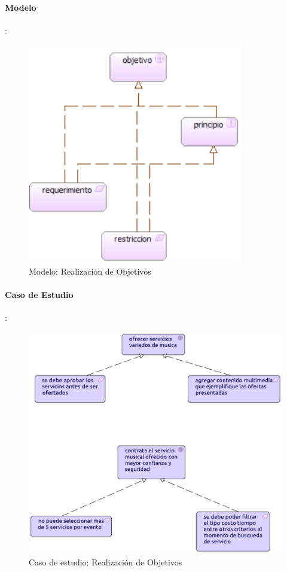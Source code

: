 \paragraph{Modelo}:
\begin{figure}[h!]
	\centering
	\includegraphics[width=0.6\linewidth]{Desarrollo/ArquitecturaEmpresarial/Motivacion/imgs/realizacionObjMetamodelo.PNG}
	\caption{Modelo: Realización de Objetivos}
\end{figure}

\newpage

\paragraph{Caso de Estudio}:

\begin{figure}[h!]
	\centering
	\includegraphics[width=\linewidth]{Desarrollo/ArquitecturaEmpresarial/Motivacion/imgs/realizacionObj.pdf}
	\caption{Caso de estudio: Realización de Objetivos}
\end{figure}

